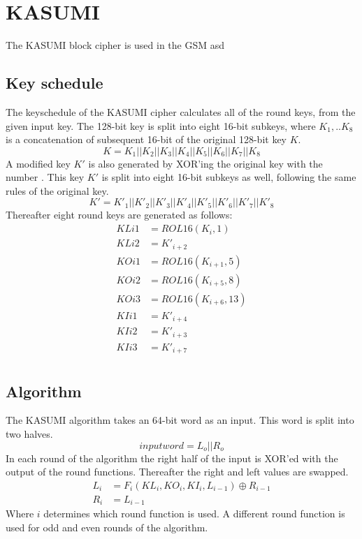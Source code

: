 \chapter{KASUMI}
\label{ch:kas}
The KASUMI block cipher is used in the GSM asd
\section{Key schedule}
The keyschedule of the KASUMI cipher calculates all of the round keys,
from the given input key. The 128-bit key is split into eight 16-bit
subkeys, where $K_1,..K_8$ is a concatenation of subsequent 16-bit of
the original 128-bit key $K$.
\[K = K_1 || K_2 || K_3 || K_4 || K_5 || K_6 || K_7 || K_8\]
A modified key $K'$ is also generated by XOR'ing the original key with
the number . This key $K'$ is split
into eight 16-bit subkeys as well, following the same rules of the
original key.
\[K' = K'_1 || K'_2 || K'_3 || K'_4 || K'_5 || K'_6 || K'_7 || K'_8\]
Thereafter eight round keys are generated as follows:
\begin{align*}
  KLi1 &= ROL16(K_i,1)\\
  KLi2 &= K'_{i+2}\\
  KOi1 &= ROL16(K_{i + 1},5)\\
  KOi2 &= ROL16(K_{i + 5},8)\\
  KOi3 &= ROL16(K_{i + 6},13)\\
  KIi1 &= K'_{i+4}\\
  KIi2 &= K'_{i+3}\\
  KIi3 &= K'_{i+7}\\
\end{align*}

\section{Algorithm}
The KASUMI algorithm takes an 64-bit word as an input. This word is
split into two halves.
\[ inputword = L_o || R_o\]
In each round of the algorithm the right half of the input is XOR'ed
with the output of the round functions. Thereafter the right and left
values are swapped. 
\begin{align*}
  L_i &= F_i(KL_i,KO_i,KI_i,L_{i - 1}) \oplus R_{i - 1} \\
  R_i &= L_{i - 1}
\end{align*}
Where $i$ determines which round function is used. A different round
function is used for odd and even rounds of the algorithm.

